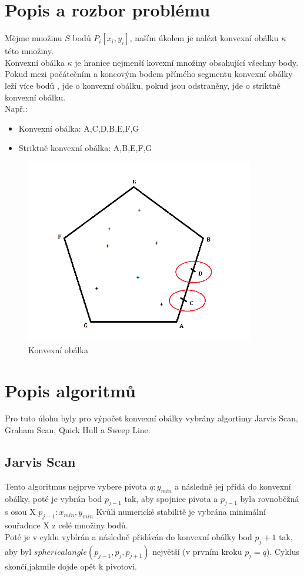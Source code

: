 \documentclass[a4paper, 12pt]{article}
\begin{document}
\clearpage

\section{Popis a rozbor problému}

Mějme množinu $S$ bodů $P_i [x_i, y_i]$, naším úkolem je nalézt konvexní obálku $\kappa$ této množiny.\\
  
Konvexní obálka $\kappa$ je hranice nejmenší kovexní množiny obsahující všechny body. \\
Pokud mezi počátečním a koncovým bodem přímého segmentu konvexní obálky leží více bodů , jde o konvexní obálku, pokud jsou odstraněny, jde o striktně konvexní obálku. \\
Např.:
\begin{itemize}
\item Konvexní obálka: A,C,D,B,E,F,G
\item Striktně konvexní obálka: A,B,E,F,G
\end{itemize}
\begin{figure}[h]
	\centering
	\includegraphics[width=10cm]{KO.png}
	\caption{Konvexní obálka}
\end{figure}


\clearpage
\section{Popis algoritmů}

Pro tuto úlohu byly pro výpočet konvexní obálky vybrány algortimy Jarvis Scan, Graham Scan, Quick Hull a Sweep Line.\\

\subsection{Jarvis Scan}
Tento algoritmus nejprve vybere pivota $q: y_{min}$ a následně jej přidá do konvexní obálky, poté je vybrán bod $p_{j-1}$ tak, aby spojnice pivota a $p_{j-1}$ byla rovnoběžná s osou X $p_{j-1}: x_{min}, y_{min}$ Kvůli numerické stabilitě je vybrána minimální souřadnce X z celé množiny bodů. \\
Poté je v cyklu vybírán a následně přidáván do konvexní obálky bod $p_j+1$ tak, aby byl $sphericalangle (p_{j-1}, p_j, p_{j+1})$ největší (v prvním kroku $p_j = q$). Cyklus skončí,jakmile dojde opět k pivotovi.
\vspace{1.5cm}
\end{document}
